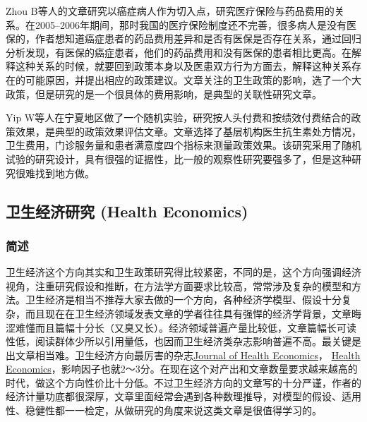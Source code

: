 \documentclass[11pt, a4paper]{article}
\begin{document}
Zhou B等人的文章研究以癌症病人作为切入点，研究医疗保险与药品费用的关系。在2005–2006年期间，那时我国的医疗保险制度还不完善，很多病人是没有医保的，作者想知道癌症患者的药品费用差异和是否有医保是否存在关系，通过回归分析发现，有医保的癌症患者，他们的药品费用和没有医保的患者相比更高。在解释这种关系的时候，就要回到政策本身以及医患双方行为方面去，解释这种关系存在的可能原因，并提出相应的政策建议。文章关注的卫生政策的影响，选了一个大政策，但是研究的是一个很具体的费用影响，是典型的关联性研究文章。

Yip W等人在宁夏地区做了一个随机实验，研究按人头付费和按绩效付费结合的政策效果，是典型的政策效果评估文章。文章选择了基层机构医生抗生素处方情况，卫生费用，门诊服务量和患者满意度四个指标来测量政策效果。该研究采用了随机试验的研究设计，具有很强的证据性，比一般的观察性研究要强多了，但是这种研究很难找到地方做。


\subsection{卫生经济研究 (Health Economics)}

\subsubsection{简述}
卫生经济这个方向其实和卫生政策研究得比较紧密，不同的是，这个方向强调经济视角，注重研究假设和推断，在方法学方面要求比较高，常常涉及复杂的模型和方法。卫生经济是相当不推荐大家去做的一个方向，各种经济学模型、假设十分复杂，而且现在在卫生经济领域发表文章的学者往往具有强悍的经济学背景，文章晦涩难懂而且篇幅十分长（又臭又长）。经济领域普遍产量比较低，文章篇幅长可读性低，阅读群体少所以引用量低，也因而卫生经济类杂志影响普遍不高。最关键是出文章相当难。卫生经济方向最厉害的杂志\href{http://www.sciencedirect.com/science/journal/01676296}{Journal of Health Economics}， \href{http://onlinelibrary.wiley.com/journal/10.1002/(ISSN)1099-1050}{Health Economics}，影响因子也就2～3分。在现在这个对产出和文章数量要求越来越高的时代，做这个方向性价比十分低。不过卫生经济方向的文章写的十分严谨，作者的经济计量功底都很深厚，文章里面经常会遇到各种数理推导，对模型的假设、适用性、稳健性都一一检定，从做研究的角度来说这类文章是很值得学习的。
\end{document}
